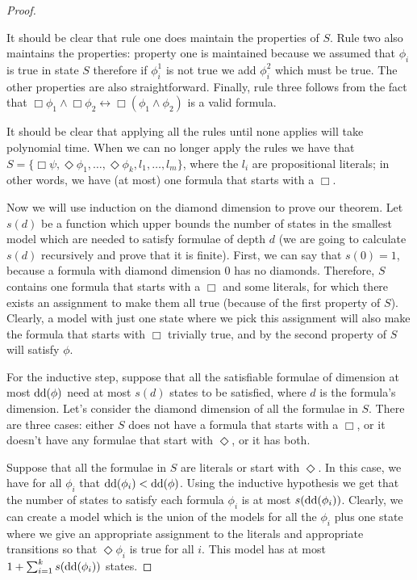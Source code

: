 \documentclass{llncs}
\newcommand{\dd}{\ensuremath \textrm{dd}}
\begin{document}
\begin{proof}
\begin{enumerate}
\end{enumerate}

It should be clear that rule one does maintain the properties of $S$. Rule two
also maintains the properties: property one is maintained because we assumed
that $\phi_i$ is true in state $S$ therefore if $\phi_i^1$ is not true we add
$\phi_i^2$ which must be true. The other properties are also straightforward.
Finally, rule three follows from the fact that $\Box \phi_1 \land \Box \phi_2
\leftrightarrow \Box (\phi_1 \land \phi_2)$ is a valid formula.

It should be clear that applying all the rules until none applies will take
polynomial time.  When we can no longer apply the rules we have that $S=\{\Box
\psi, \Diamond \phi_1, \ldots, \Diamond \phi_k, l_1, \ldots, l_m\}$, where the
$l_i$ are propositional literals; in other words, we have (at most) one formula
that starts with a $\Box$.

Now we will use induction on the diamond dimension to prove our theorem. Let
$s(d)$ be a function which upper bounds the number of states in the smallest
model which are needed to satisfy formulae of depth $d$ (we are going to
calculate $s(d)$ recursively and prove that it is finite).  First, we can say
that $s(0)=1$, because a formula with diamond dimension 0 has no diamonds.
Therefore, $S$ contains one formula that starts with a $\Box$ and some
literals, for which there exists an assignment to make them all true (because
of the first property of $S$). Clearly, a model with just one state where we
pick this assignment will also make the formula that starts with $\Box$
trivially true, and by the second property of $S$ will satisfy $\phi$.

For the inductive step, suppose that all the satisfiable formulae of dimension
at most $\dd(\phi)$ need at most $s(d)$ states to be satisfied, where $d$ is
the formula's dimension.  Let's consider the diamond dimension of all the
formulae in $S$.   There are three cases: either $S$ does not have a formula
that starts with a $\Box$, or it doesn't have any formulae that start with
$\Diamond$, or it has both.

Suppose that all the formulae in $S$ are literals or start with $\Diamond$. In
this case, we have for all $\phi_i$ that $\dd(\phi_i)<\dd(\phi)$. Using the
inductive hypothesis we get that the number of states to satisfy each formula
$\phi_i$ is at most $s(\dd(\phi_i))$. Clearly, we can create a model which is
the union of the models for all the $\phi_i$ plus one state where we give an
appropriate assignment to the literals and appropriate transitions so that
$\Diamond \phi_i$ is true for all $i$. This model has at most $1+\sum_{i=1}^k
s(\dd(\phi_i))$ states.


\end{proof}
\end{document}
